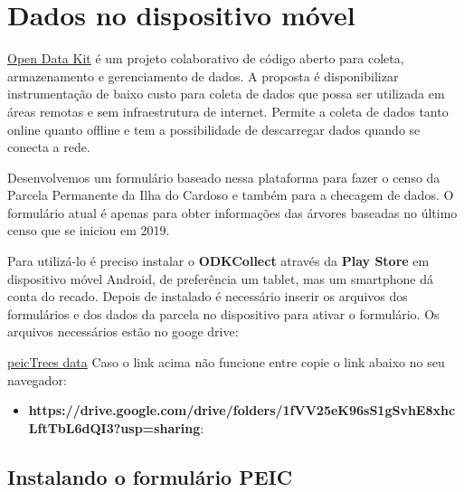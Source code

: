 \documentclass[a4paper, oneside, 10pt]{article}
\date{\today}
\title{}
\author{Alexandre Adalardo de Oliveira}
\begin{document}
\section{\texorpdfstring{Dados no  dispositivo móvel}{ da Parcela PEIC}}
\label{sec:coleta_de_dados_por_dispositivo_movel}


\href{https://opendatakit.org/}{Open Data Kit} é um projeto colaborativo de código aberto para coleta, armazenamento e gerenciamento de dados. A proposta é disponibilizar instrumentação de baixo custo para coleta de dados que possa ser utilizada em áreas remotas e sem infraestrutura de internet. Permite a coleta de dados tanto online quanto offline e tem a possibilidade de descarregar dados quando se conecta a rede.

Desenvolvemos um formulário baseado nessa plataforma para fazer o censo da Parcela Permanente da Ilha do Cardoso e também para a checagem de dados. O formulário atual é apenas para obter informações das árvores baseadas no último censo que se iniciou em 2019.

Para utilizá-lo é preciso instalar o \textbf{ODKCollect} através da \textbf{Play Store} em dispositivo móvel Android, de preferência um tablet, mas um smartphone dá conta do recado.
Depois de instalado é necessário inserir os arquivos dos formulários e dos dados da parcela no dispositivo para ativar o formulário. Os arquivos necessários estão no googe drive:

\href{https://drive.google.com/drive/folders/1fVV25eK96sS1gSvhE8xhcLftTbL6dQI3?usp=sharing}{peicTrees data}
Caso o link acima não funcione entre copie o link abaixo no seu navegador:

\begin{itemize}
  \item  \small\textbf{https://drive.google.com/drive/folders/1fVV25eK96sS1gSvhE8xhcLftTbL6dQI3?usp=sharing}:
\end{itemize}


\subsection{\texorpdfstring{Instalando o formulário PEIC}{Instalando o formulario PEIC}}
\label{sec:instalando_o_formulario_peic}
\end{document}
